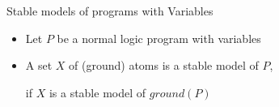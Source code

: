 \begin{frame}{Stable models of programs with Variables}
  \bigskip
  \begin{itemize}
  \item
    Let $P$ be a normal logic program with variables
    \medskip
  \item<2->
    A set $X$ of (\alert{ground}) atoms is a \alert{stable model} of $P$,
    \par\smallskip
    if $X$ is a stable model of \alert{$\mathit{ground}(P)$}
  \end{itemize}
\end{frame}
%

